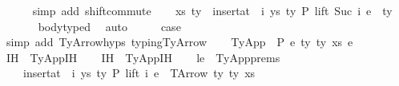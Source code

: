 \begin{isabellebody}
\ \ \ \ \isamarkupfalse%
\ {\isacharparenleft}{\kern0pt}simp\ add{\isacharcolon}{\kern0pt}\ shift{\isacharunderscore}{\kern0pt}commute{\isacharparenright}{\kern0pt}\isanewline
\isanewline
\ \ \isamarkupfalse%
\ {\isachardoublequoteopen}{\isacharparenleft}{\kern0pt}xs{\isacharcomma}{\kern0pt}\ ty{}{\isacharparenright}{\kern0pt}\ {\isacharhash}{\kern0pt}\ insert{\isacharunderscore}{\kern0pt}at\ {\isasymGamma}\ i\ {\isacharparenleft}{\kern0pt}ys{\isacharcomma}{\kern0pt}\ ty{}{\isacharparenright}{\kern0pt}\ {\isasymturnstile}{\isacharbraceleft}{\kern0pt}P{\isacharbraceright}{\kern0pt}\ lift\ {\isacharparenleft}{\kern0pt}Suc\ i{\isacharparenright}{\kern0pt}\ e\ {\isacharcolon}{\kern0pt}\ ty{}{\isacharprime}{\kern0pt}{\isachardoublequoteclose}\isanewline
\ \ \ \ \ \isamarkupfalse%
\ body{\isacharunderscore}{\kern0pt}typed\ \isamarkupfalse%
\ auto\isanewline
\isanewline
\ \ \isamarkupfalse%
\ \isamarkupfalse%
\ {\isacharquery}{\kern0pt}case\isanewline
\ \ \ \ \isamarkupfalse%
\ {\isacharparenleft}{\kern0pt}simp\ add{\isacharcolon}{\kern0pt}\ TyArrow{\isachardot}{\kern0pt}hyps{\isacharparenleft}{\kern0pt}{}{\isacharcomma}{\kern0pt}{}{\isacharparenright}{\kern0pt}\ typing{\isachardot}{\kern0pt}TyArrow{\isacharparenright}{\kern0pt}\isanewline
\isanewline
{}\isamarkupfalse%
\isanewline
\ \ \isamarkupfalse%
\ {\isacharparenleft}{\kern0pt}TyApp\ {\isasymGamma}\ P\ e{}\ ty{}\ ty{}\ xs\ e{}{\isacharparenright}{\kern0pt}\isanewline
\ \ \isamarkupfalse%
\ IH{}\ {\isacharequal}{\kern0pt}\ TyApp{\isachardot}{\kern0pt}IH{\isacharparenleft}{\kern0pt}{}{\isacharparenright}{\kern0pt}\isanewline
\ \ \isamarkupfalse%
\ IH{}\ {\isacharequal}{\kern0pt}\ TyApp{\isachardot}{\kern0pt}IH{\isacharparenleft}{\kern0pt}{}{\isacharparenright}{\kern0pt}\isanewline
\ \ \isamarkupfalse%
\ le\ {\isacharequal}{\kern0pt}\ TyApp{\isachardot}{\kern0pt}prems\isanewline
\isanewline
\ \ \isamarkupfalse%
\isanewline
\ \ \ \ {\isachardoublequoteopen}insert{\isacharunderscore}{\kern0pt}at\ {\isasymGamma}\ i\ {\isacharparenleft}{\kern0pt}ys{\isacharcomma}{\kern0pt}\ ty{}{\isacharprime}{\kern0pt}{\isacharparenright}{\kern0pt}\ {\isasymturnstile}{\isacharbraceleft}{\kern0pt}P{\isacharbraceright}{\kern0pt}\ lift\ i\ e{}\ {\isacharcolon}{\kern0pt}\ TArrow\ ty{}\ ty{}\ xs{\isachardoublequoteclose}\isanewline

\end{isabellebody}
